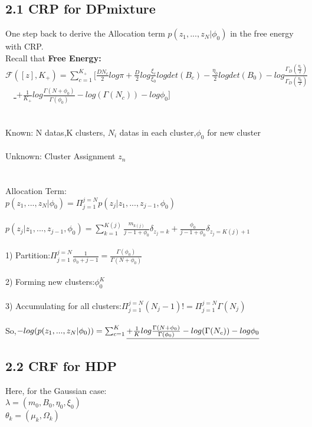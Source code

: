 \documentclass{article}
\begin{document}
\begin{spacing}{1.1}
\subsection*{2.1 CRP for DPmixture}
One step back to derive the Allocation term $p(z_{1},...,z_{N}|\phi_{0})$ in the free energy with CRP.\\
Recall that \large {\bf  Free Energy:} \\
$\mathcal{F}([z],K_{+})=\sum_{c=1}^{K_{+}}[\frac{DN_{c}}{2}log\pi+\frac{D}{2}log\frac{\xi_{c}}{\xi_{0}}log det(B_{c})
-\frac{\eta_{0}}{2}log det(B_{0})-log \frac{\Gamma_{D}(\frac{\eta_{c}}{2})}{\Gamma_{D}(\frac{\eta_{0}}{2})}$\\
\ \  \underline{ $+\frac{1}{K_{+}}log \frac{\Gamma(N+\phi_{0})}{\Gamma(\phi_{0})} -log(\Gamma(N_{c}))-log \phi_{0}]$}\\
\\ \\ Known: N datas,K clusters, {$N_{i}$} datas in each cluster,$\phi_{0}$ for new cluster\\
 \\ Unknown: Cluster Assignment $z_{n}$\\
\\ \\ Allocation Term: \\
$p(z_{1},...,z_{N}|\phi_{0})=\Pi_{j=1}^{j=N}p(z_{j}|z_{1},...,z_{j-1},\phi_{0})$\\ \\
$p(z_{j}|z_{1},...,z_{j-1},\phi_{0})=\sum_{k=1}^{K(j)}\frac{m_{k(j)}}{j-1+\phi_{0}}\delta_{z_{j}=k}+\frac{\phi_{0}}{j-1+\phi_{0}}\delta_{z_{j}=K(j)+1}$\\ \\
1) Partition:$\Pi_{j=1}^{j=N}\frac{1}{\phi_{0}+j-1}=\frac{\Gamma(\phi_{0})}{\Gamma(N+\phi_{0})}$\\ \\
2) Forming new clusters:$\phi_{0}^{K}$\\ \\
3) Accumulating for all clusters:$\Pi_{j=1}^{j=N}(N_{j}-1)!=\Pi_{j=1}^{j=N}\Gamma(N_{j})$\\ \\
So,$-log(p(z_{1},...,z_{N}|\phi_{0}))=\sum_{c=1}^{K}\underline{ +\frac{1}{K}log \frac{\Gamma(N+\phi_{0})}{\Gamma(\phi_{0})} -log(\Gamma(N_{c}))-log \phi_{0}}\\$ \\
\subsection*{2.2 CRF for HDP}
Here, for the Gaussian case:\\
$\lambda=(m_{0},B_{0},\eta_{0},\xi_{0})$\\
$\theta_{k}=(\mu_{k},\Omega_{k})$\\ \\


\end{spacing}
\end{document}
